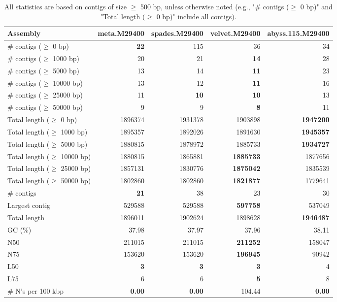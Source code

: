 \documentclass[12pt,a4paper]{article}
\begin{document}
\begin{table}[ht]
\begin{center}
\caption{All statistics are based on contigs of size $\geq$ 500 bp, unless otherwise noted (e.g., "\# contigs ($\geq$ 0 bp)" and "Total length ($\geq$ 0 bp)" include all contigs).}
\begin{tabular}{|l*{4}{|r}|}
\hline
Assembly & meta.M29400 & spades.M29400 & velvet.M29400 & abyss.115.M29400 \\ \hline
\# contigs ($\geq$ 0 bp) & {\bf 22} & 115 & 36 & 34 \\ \hline
\# contigs ($\geq$ 1000 bp) & 20 & 21 & {\bf 14} & 28 \\ \hline
\# contigs ($\geq$ 5000 bp) & 13 & 14 & {\bf 11} & 23 \\ \hline
\# contigs ($\geq$ 10000 bp) & 13 & 12 & {\bf 11} & 16 \\ \hline
\# contigs ($\geq$ 25000 bp) & 11 & {\bf 10} & {\bf 10} & 13 \\ \hline
\# contigs ($\geq$ 50000 bp) & 9 & 9 & {\bf 8} & 11 \\ \hline
Total length ($\geq$ 0 bp) & 1896374 & 1931378 & 1903898 & {\bf 1947200} \\ \hline
Total length ($\geq$ 1000 bp) & 1895357 & 1892026 & 1891630 & {\bf 1945357} \\ \hline
Total length ($\geq$ 5000 bp) & 1880815 & 1878972 & 1885733 & {\bf 1934727} \\ \hline
Total length ($\geq$ 10000 bp) & 1880815 & 1865881 & {\bf 1885733} & 1877656 \\ \hline
Total length ($\geq$ 25000 bp) & 1857131 & 1830776 & {\bf 1875042} & 1835539 \\ \hline
Total length ($\geq$ 50000 bp) & 1802860 & 1802860 & {\bf 1821877} & 1779641 \\ \hline
\# contigs & {\bf 21} & 38 & 23 & 30 \\ \hline
Largest contig & 529588 & 529588 & {\bf 597758} & 537049 \\ \hline
Total length & 1896011 & 1902624 & 1898628 & {\bf 1946487} \\ \hline
GC (\%) & 37.98 & 37.97 & 37.96 & 38.11 \\ \hline
N50 & 211015 & 211015 & {\bf 211252} & 158047 \\ \hline
N75 & 153620 & 153620 & {\bf 196945} & 90942 \\ \hline
L50 & {\bf 3} & {\bf 3} & {\bf 3} & 4 \\ \hline
L75 & 6 & 6 & {\bf 5} & 8 \\ \hline
\# N's per 100 kbp & {\bf 0.00} & {\bf 0.00} & 104.44 & {\bf 0.00} \\ \hline
\end{tabular}
\end{center}
\end{table}
\end{document}
